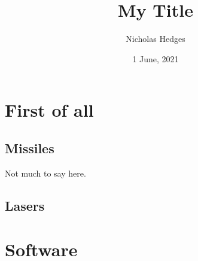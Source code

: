 \documentclass{apa-article}
\title{My Title}
\author{Nicholas Hedges}
\date{1 June, 2021}
\begin{document}
\maketitle

\section{First of all}
\lipsum
\subsection{Missiles}
Not much to say here.
\citep{BobsBook01}
\subsection{Lasers}
\section{Software}
\printbibliography
\end{document}
